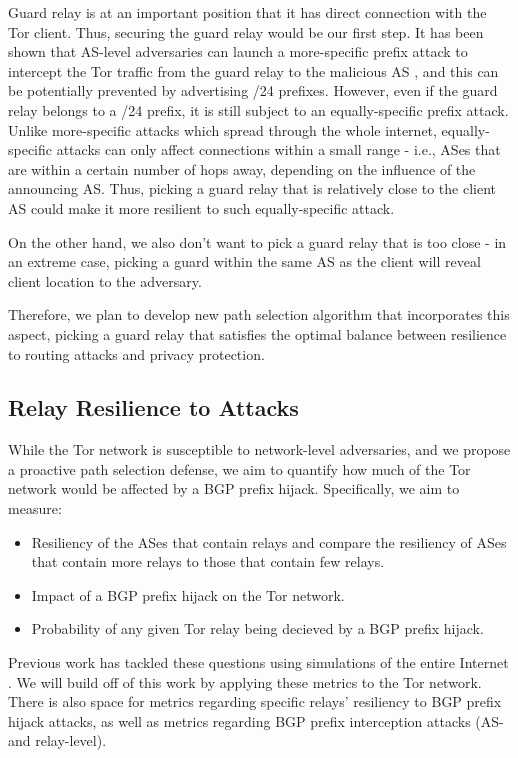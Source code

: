 \documentclass{acm_proc_article-sp}
\begin{document}
Guard relay is at an important position that it has direct connection with the Tor client. Thus, securing the guard relay would be our first step. It has been shown that AS-level adversaries can launch a more-specific prefix attack to intercept the Tor traffic from the guard relay to the malicious AS \cite{sun2015raptor}, and this can be potentially prevented by advertising /24 prefixes. However, even if the guard relay belongs to a /24 prefix, it is still subject to an equally-specific prefix attack. Unlike more-specific attacks which spread through the whole internet, equally-specific attacks can only affect connections within a small range - i.e., ASes that are within a certain number of hops away, depending on the influence of the announcing AS. Thus, picking a guard relay that is relatively close to the client AS could make it more resilient to such equally-specific attack.

On the other hand, we also don't want to pick a guard relay that is too close - in an extreme case, picking a guard within the same AS as the client will reveal client location to the adversary. 

Therefore, we plan to develop new path selection algorithm that incorporates this aspect, picking a guard relay that satisfies the optimal balance between resilience to routing attacks and privacy protection. 

\subsection{Relay Resilience to Attacks}

While the Tor network is susceptible to network-level adversaries, and we propose a proactive path selection defense, we aim to quantify how much of the Tor network would be affected by a BGP prefix hijack.  Specifically, we aim to measure:

\begin{itemize}
\item Resiliency of the ASes that contain relays and compare the resiliency of ASes that contain more relays to those that contain few relays.
\item Impact of a BGP prefix hijack on the Tor network.
\item Probability of any given Tor relay being decieved by a BGP prefix hijack.
\end{itemize}

Previous work has tackled these questions using simulations of the entire Internet \cite{lad2007understanding}.  We will build off of this work by applying these metrics to the Tor network.  There is also space for metrics regarding specific relays' resiliency to BGP prefix hijack attacks, as well as metrics regarding BGP prefix interception attacks (AS- and relay-level).  
\end{document}
